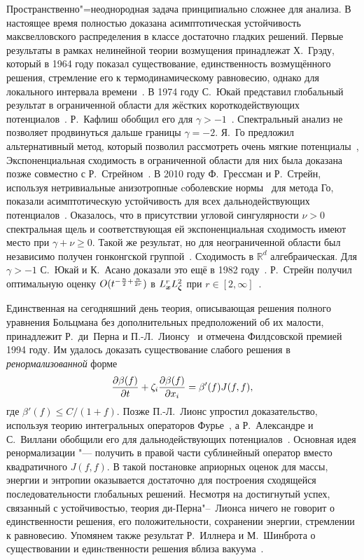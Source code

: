 Пространственно"=неоднородная задача принципиально сложнее для анализа.
В настоящее время полностью доказана асимптотическая устойчивость максвелловского распределения
в классе достаточно гладких решений.
Первые результаты в рамках нелинейной теории возмущения принадлежат Х.~Грэду, который в 1964 году показал
существование, единственность возмущённого решения, стремление его к термодинамическому равновесию,
однако для локального интервала времени~\cite{Grad1965}.
В 1974 году С.~Юкай представил глобальный результат в ограниченной области
для жёстких короткодействующих потенциалов~\cite{Ukai1974}.
Р.~Кафлиш обобщил его для \(\gamma>-1\)~\cite{Caflisch1980b}.
Спектральный анализ не позволяет продвинуться дальше границы \(\gamma=-2\).
Я.~Го предложил альтернативный метод, который позволил рассмотреть очень мягкие потенциалы~\cite{Guo2003},
Экспоненциальная сходимость в ограниченной области для них была доказана позже совместно с Р.~Стрейном~\cite{Strain2008}.
В 2010 году Ф.~Грессман и Р.~Стрейн, используя нетривиальные анизотропные cоболевские нормы~\cite{Mouhot2007} для метода Го,
показали асимптотическую устойчивость для всех дальнодействующих потенциалов~\cite{Strain2011}.
Оказалось, что в присутствии угловой сингулярности \(\nu>0\) спектральная щель и
соответствующая ей экспоненциальная сходимость имеют место при \(\gamma+\nu\geq0\).
Такой же результат, но для неограниченной области был независимо получен
гонконгской группой~\cite{Alexandre2012soft, Alexandre2011hard, Alexandre2011properties}.
Сходимость в \(\mathbb{R}^d\) алгебраическая. Для \(\gamma>-1\) С.~Юкай и К.~Асано доказали это ещё в 1982 году~\cite{Ukai1982}.
Р.~Стрейн получил оптимальную оценку \(\OO{t^{-\frac{n}2+\frac{n}{2r}}}\) в \(L^r_\bx L^2_\bzeta\) при \(r\in[2,\infty]\)~\cite{Strain2012}.

Единственная на сегодняшний день теория, описывающая решения полного уравнения Больцмана без
дополнительных предположений об их малости, принадлежит Р.~ди~Перна и П.-Л.~Лионсу~\cite{Lions1989}
и отмечена Филдсовской премией 1994 году.
Им удалось доказать существование слабого решения в \emph{ренормализованной} форме
\begin{equation*}
    \pder[\beta(f)]{t} + \zeta_i\pder[\beta(f)]{x_i} = \beta'(f)J(f,f),
\end{equation*}
где \(\beta'(f) \leq C/(1+f)\).
Позже П.-Л.~Лионс упростил доказательство, используя теорию интегральных операторов Фурье~\cite{Lions1994},
а Р.~Александре и С.~Виллани обобщили его для дальнодействующих потенциалов~\cite{Alexandre2002}.
Основная идея ренормализации "--- получить в правой части сублинейный оператор вместо квадратичного \(J(f,f)\).
В такой постановке априорных оценок для массы, энергии и энтропии оказывается достаточно
для построения сходящейся последовательности глобальных решений.
Несмотря на достигнутый успех, связанный с устойчивостью, теория ди-Перна"--~Лионса ничего не говорит о
единственности решения, его положительности, сохранении энергии, стремлении к равновесию.
Упомянем также результат Р.~Иллнера и М.~Шинброта о существовании и единcтвенности решения вблиза вакуума~\cite{Illner1984}.


